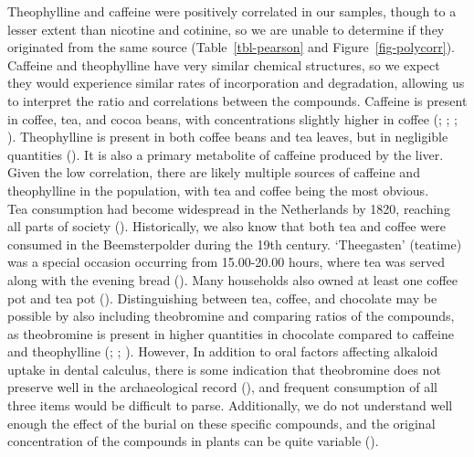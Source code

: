 \documentclass[
  b5paper,
]{book}
\begin{document}
Theophylline and caffeine were positively correlated in our samples,
though to a lesser extent than nicotine and cotinine, so we are unable
to determine if they originated from the same source
(Table~\ref{tbl-pearson} and Figure~\ref{fig-polycorr}). Caffeine and
theophylline have very similar chemical structures, so we expect they
would experience similar rates of incorporation and degradation,
allowing us to interpret the ratio and correlations between the
compounds. Caffeine is present in coffee, tea, and cocoa beans, with
concentrations slightly higher in coffee
(;
;
;
).
Theophylline is present in both coffee beans and tea leaves, but in
negligible quantities
().
It is also a primary metabolite of caffeine produced by the liver. Given
the low correlation, there are likely multiple sources of caffeine and
theophylline in the population, with tea and coffee being the most
obvious.\\
Tea consumption had become widespread in the Netherlands by 1820,
reaching all parts of society
().
Historically, we also know that both tea and coffee were consumed in the
Beemsterpolder during the 19th century. `Theegasten' (teatime) was a
special occasion occurring from 15.00-20.00 hours, where tea was served
along with the evening bread
().
Many households also owned at least one coffee pot and tea pot
(). Distinguishing
between tea, coffee, and chocolate may be possible by also including
theobromine and comparing ratios of the compounds, as theobromine is
present in higher quantities in chocolate compared to caffeine and
theophylline (; ; ). However, In addition to oral factors affecting alkaloid uptake
in dental calculus, there is some indication that theobromine does not
preserve well in the archaeological record
(), and
frequent consumption of all three items would be difficult to parse.
Additionally, we do not understand well enough the effect of the burial
on these specific compounds, and the original concentration of the
compounds in plants can be quite variable
().
\end{document}
